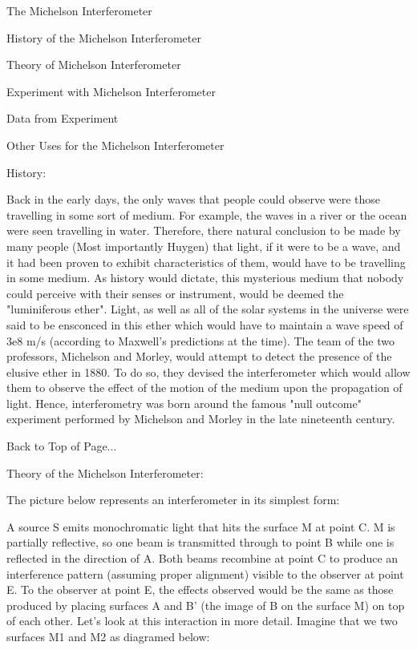 
The Michelson Interferometer

History of the Michelson Interferometer

Theory of Michelson Interferometer

Experiment with Michelson Interferometer

Data from Experiment

Other Uses for the Michelson Interferometer

History:

   Back in the early days, the only waves that people could observe were those travelling in some sort of medium.  For example, the waves in a river or the ocean were seen travelling in water.  Therefore, there natural conclusion to be made by many people (Most importantly Huygen) that light, if  it were to be a wave, and it had been proven to exhibit characteristics of them, would have to be travelling in some medium.  As history would dictate, this mysterious medium that nobody could perceive with their senses or instrument, would be deemed the "luminiferous ether".  Light, as well as all of the solar systems in the universe were said to be ensconced in this ether which would have to maintain a wave speed of 3e8 m/s (according to Maxwell's predictions at the time).   The team of the two professors,   Michelson and Morley, would attempt to detect the presence of the elusive ether in 1880.  To do so, they devised the interferometer which would allow them to observe the effect of the motion of the medium upon the propagation of light.   Hence, interferometry was born around the famous "null outcome" experiment performed by Michelson and Morley in the late nineteenth century.  

Back to Top of Page...

Theory of the Michelson Interferometer:

    The picture below represents an interferometer in its simplest form:

        

A source S emits monochromatic light that hits the surface M at point C.  M is partially reflective, so one beam is transmitted through to point B while one is reflected in the direction of A.  Both beams recombine at point C to produce an interference pattern (assuming proper alignment) visible to the observer at point E.  To the observer at point E, the effects observed would be the same as those produced by placing surfaces A and B' (the image of B on the surface M) on top of each other.  Let's look at this interaction in more detail.  Imagine that we two surfaces M1 and M2 as diagramed below:



